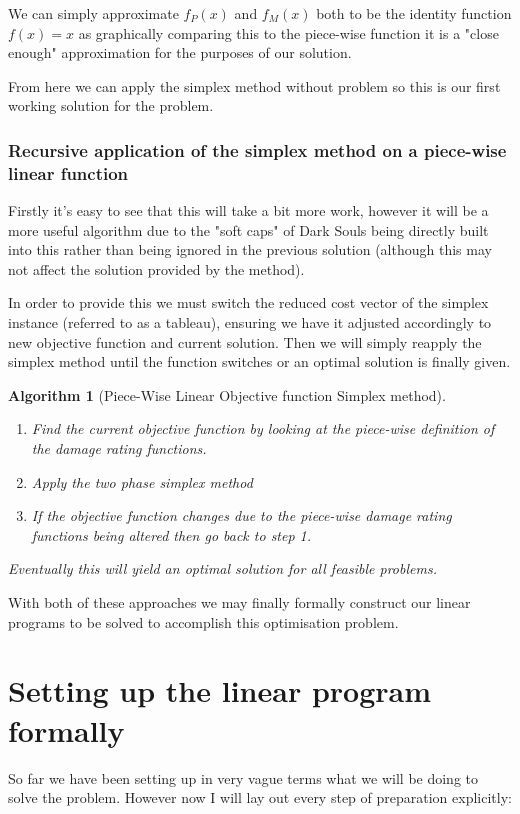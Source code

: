 \documentclass{article}
\newtheorem{algorithm}{Algorithm}[section]
\begin{document}
We can simply approximate $f_P(x)$ and $f_M(x)$ both to be the identity function $f(x) = x$ as graphically comparing this to the piece-wise function it is a "close enough" approximation for the purposes of our solution.

\par From here we can apply the simplex method without problem so this is our first working solution for the problem.

\subsubsection{Recursive application of the simplex method on a piece-wise linear function}
\par Firstly it's easy to see that this will take a bit more work, however it will be a more useful algorithm due to the "soft caps" of Dark Souls being directly built into this rather than being ignored in the previous solution (although this may not affect the solution provided by the method).

\par In order to provide this we must switch the reduced cost vector of the simplex instance (referred to as a tableau), ensuring we have it adjusted accordingly to new objective function and current solution. Then we will simply reapply the simplex method until the function switches or an optimal solution is finally given.

\begin{algorithm}[Piece-Wise Linear Objective function Simplex method]
~\\
    \begin{enumerate}
        \item Find the current objective function by looking at the piece-wise definition of the damage rating functions.
        \item Apply the two phase simplex method
        \item If the objective function changes due to the piece-wise damage rating functions being altered then go back to step 1.
    \end{enumerate}
    Eventually this will yield an optimal solution for all feasible problems.
\end{algorithm}

\par With both of these approaches we may finally formally construct our linear programs to be solved to accomplish this optimisation problem.

\section{Setting up the linear program formally}
\par So far we have been setting up in very vague terms what we will be doing to solve the problem. However now I will lay out every step of preparation explicitly:
\end{document}
